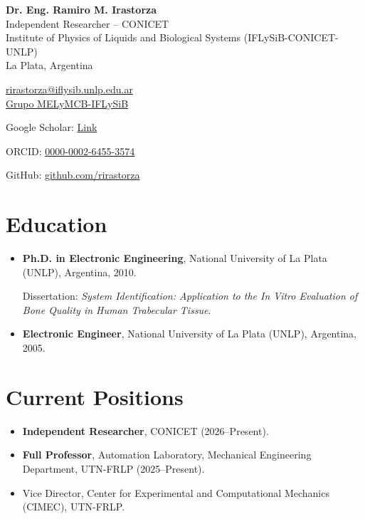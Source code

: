 \documentclass[11pt]{article}
\begin{document}
\begin{center}
    {\LARGE \textbf{Dr. Eng. Ramiro M. Irastorza}}\\[0.2cm]
    Independent Researcher -- CONICET\\
    Institute of Physics of Liquids and Biological Systems (IFLySiB-CONICET-UNLP)\\
    La Plata, Argentina\\

    \vspace{0.3cm}

    \href{mailto:rirastorza@iflysib.unlp.edu.ar}{rirastorza@iflysib.unlp.edu.ar} \\

    \href{https://mel.iflysib.unlp.edu.ar/}{Grupo MELyMCB-IFLySiB}

    Google Scholar:
    \href{https://scholar.google.com/citations?hl=en&user=0LriuSsAAAAJ&view_op=list_works&sortby=pubdate}{Link}

    ORCID:
    \href{https://orcid.org/0000-0002-6455-3574}{0000-0002-6455-3574}

    GitHub:
    \href{https://github.com/rirastorza}{github.com/rirastorza}
\end{center}


\section*{Education}

\begin{itemize}[leftmargin=*]
    \item \textbf{Ph.D. in Electronic Engineering}, National University of La Plata (UNLP), Argentina, 2010.

    Dissertation: \textit{System Identification: Application to the In Vitro Evaluation of Bone Quality in Human Trabecular Tissue}.

    \item \textbf{Electronic Engineer}, National University of La Plata (UNLP), Argentina, 2005.
\end{itemize}

\section*{Current Positions}

\begin{itemize}[leftmargin=*]
    \item \textbf{Independent Researcher}, CONICET (2026--Present).
    \item \textbf{Full Professor}, Automation Laboratory, Mechanical Engineering Department, UTN-FRLP (2025--Present).
    \item Vice Director, Center for Experimental and Computational Mechanics (CIMEC), UTN-FRLP.
\end{itemize}
\end{document}
